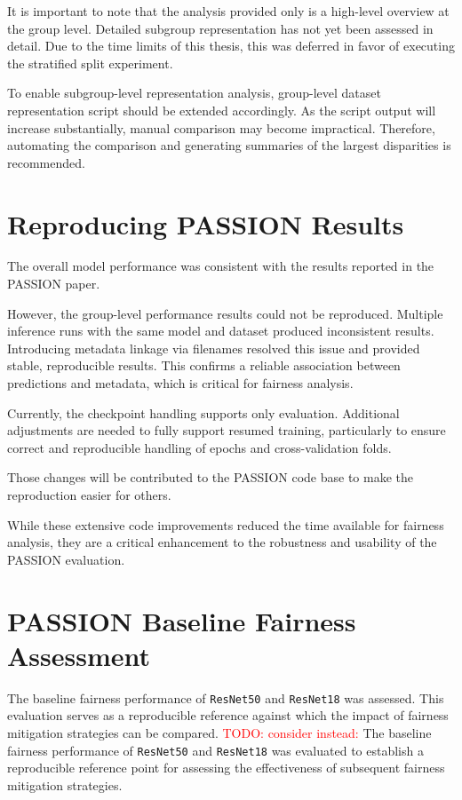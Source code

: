 \documentclass[12pt, a4paper, oneside]{book}   	%
\renewcommand{\todo}[1]{\textcolor{red}{TODO: #1}}
\begin{document}
		It is important to note that the analysis provided only is a high-level overview at the group level. Detailed subgroup representation has not yet been assessed in detail. Due to the time limits of this thesis, this was deferred in favor of executing the stratified split experiment.
		
		To enable subgroup-level representation analysis, group-level dataset representation script should be extended accordingly. As the script output will increase substantially, manual comparison may become impractical. Therefore, automating the comparison and generating summaries of the largest disparities is recommended.
		
		
		\section{Reproducing PASSION Results}
		The overall model performance was consistent with the results reported in the PASSION paper.
		
		However, the group-level performance results could not be reproduced. Multiple inference runs with the same model and dataset produced inconsistent results. Introducing metadata linkage via filenames resolved this issue and provided stable, reproducible results. This confirms a reliable association between predictions and metadata, which is critical for fairness analysis.
		
		Currently, the checkpoint handling supports only evaluation. Additional adjustments are needed to fully support resumed training, particularly to ensure correct and reproducible handling of epochs and cross-validation folds.
		
		Those changes will be contributed to the PASSION code base to make the reproduction easier for others.
		
		While these extensive code improvements reduced the time available for fairness analysis, they are a critical enhancement to the robustness and usability of the PASSION evaluation.
		
		\section{PASSION Baseline Fairness Assessment} \label{sec:evaluation}
		
		The baseline fairness performance of \texttt{ResNet50} and \texttt{ResNet18} was assessed. This evaluation serves as a reproducible reference against which the impact of fairness mitigation strategies can be compared.
		\todo{consider instead:}
		The baseline fairness performance of \texttt{ResNet50} and \texttt{ResNet18} was evaluated to establish a reproducible reference point for assessing the effectiveness of subsequent fairness mitigation strategies.
		
\end{document}
